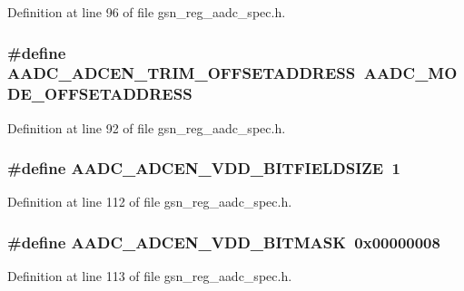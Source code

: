 Definition at line 96 of file gsn\_\-reg\_\-aadc\_\-spec.h.

\hypertarget{a00543_af03eddca2398e119c5ee8c91b092b983}{
\subsubsection[{AADC\_\-ADCEN\_\-TRIM\_\-OFFSETADDRESS}]{\setlength{\rightskip}{0pt plus 5cm}\#define AADC\_\-ADCEN\_\-TRIM\_\-OFFSETADDRESS~AADC\_\-MODE\_\-OFFSETADDRESS}}
\label{a00543_af03eddca2398e119c5ee8c91b092b983}


Definition at line 92 of file gsn\_\-reg\_\-aadc\_\-spec.h.

\hypertarget{a00543_a89e5566b93b597d73ca1f162a7f0d4c8}{
\subsubsection[{AADC\_\-ADCEN\_\-VDD\_\-BITFIELDSIZE}]{\setlength{\rightskip}{0pt plus 5cm}\#define AADC\_\-ADCEN\_\-VDD\_\-BITFIELDSIZE~1}}
\label{a00543_a89e5566b93b597d73ca1f162a7f0d4c8}


Definition at line 112 of file gsn\_\-reg\_\-aadc\_\-spec.h.

\hypertarget{a00543_a17623b8378c68680a619ee54440f8c1e}{
\subsubsection[{AADC\_\-ADCEN\_\-VDD\_\-BITMASK}]{\setlength{\rightskip}{0pt plus 5cm}\#define AADC\_\-ADCEN\_\-VDD\_\-BITMASK~0x00000008}}
\label{a00543_a17623b8378c68680a619ee54440f8c1e}


Definition at line 113 of file gsn\_\-reg\_\-aadc\_\-spec.h.

